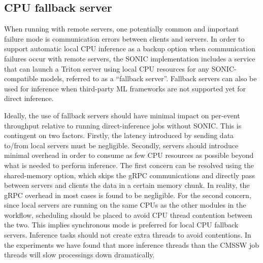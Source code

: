 \subsection{CPU fallback server}
\label{sec:fallback}
When running with remote servers, one potentially common and important failure mode is communication errors between clients and servers. In order to support automatic local CPU inference as a backup option when communication failures occur with remote servers, the SONIC implementation includes a service that can launch a Triton server using local CPU resources for any SONIC-compatible models, referred to as a ``fallback server''. Fallback servers can also be used for inference when third-party ML frameworks are not supported yet for direct inference. 

Ideally, the use of fallback servers should have minimal impact on per-event throughput relative to running direct-inference jobs without SONIC. This is contingent on two factors. Firstly, the latency introduced by sending data to/from local servers must be negligible. Secondly, servers should introduce minimal overhead in order to consume as few CPU resources as possible beyond what is needed to perform inference. The first concern can be resolved using the shared-memory option, which skips the gRPC communications and directly pass between servers and clients the data in a certain memory chunk. In reality, the gRPC overhead in most cases is found to be negligible. For the second concern, since local servers are running on the same CPUs as the other modules in the workflow, scheduling should be placed to avoid CPU thread contention between the two. This implies synchronous mode is preferred for local CPU fallback servers. Inference tasks should not create extra threads to avoid contentions. In the experiments we have found that more inference threads than the CMSSW job threads will slow processings down dramatically.

